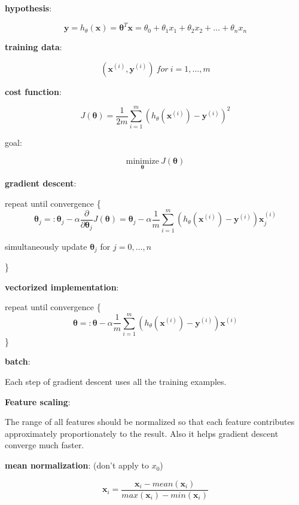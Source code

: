 \documentclass{article}
\begin{document}
\noindent \textbf{hypothesis}:

\[\textbf{y} = h_{\theta}(\textbf{x}) = \boldsymbol{\theta}^T \textbf{x} = \theta_0 + \theta_1 x_1 + \theta_2 x_2 + \dots + \theta_n x_n\]

\noindent \textbf{training data}:

\[(\textbf{x}^{(i)}, \textbf{y}^{(i)})\:for\:i = 1, \dots, m\]

\noindent \textbf{cost function}:

\[J(\boldsymbol{\theta}) = \frac{1}{2m} \sum_{i = 1}^m (h_{\theta}(\textbf{x}^{(i)}) - \textbf{y}^{(i)})^2\]

\noindent goal:

\[\underset{\boldsymbol{\theta}}{\text{minimize}} \: J(\boldsymbol{\theta})\]

\noindent \textbf{gradient descent}:

\noindent repeat until convergence \{
\[\boldsymbol{\theta}_j =: \boldsymbol{\theta}_j - \alpha \frac{\partial}{\partial \boldsymbol{\theta}_j} J(\boldsymbol{\theta}) = \boldsymbol{\theta}_j - \alpha \frac{1}{m} \sum_{i = 1}^m (h_{\theta}(\textbf{x}^{(i)}) - \textbf{y}^{(i)}) \textbf{x}^{(i)}_j\]
\centerline{simultaneously update \(\boldsymbol{\theta}_j\) for \(j = 0, \dots, n\)}
\}

\bigskip

\noindent \textbf{vectorized implementation}:

\noindent repeat until convergence \{
\[\boldsymbol{\theta} =: \boldsymbol{\theta} - \alpha \frac{1}{m} \sum_{i = 1}^m (h_{\theta}(\textbf{x}^{(i)}) - \textbf{y}^{(i)}) \textbf{x}^{(i)}\]
\}

\bigskip


\noindent \textbf{batch}:

\noindent Each step of gradient descent uses all the training examples.

\bigskip

\noindent \textbf{Feature scaling}:

\noindent The range of all features should be normalized so that each feature contributes approximately proportionately to the result. Also it helps gradient descent converge much faster.

\bigskip

\noindent \textbf{mean normalization}: (don't apply to \(x_0\))

\[\textbf{x}_i = \frac{\textbf{x}_i - mean(\textbf{x}_i)}{max(\textbf{x}_i) - min(\textbf{x}_i)}\]

\bigskip
\end{document}
